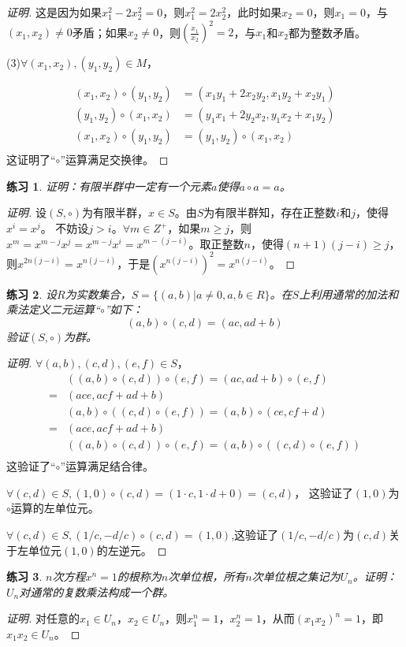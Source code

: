\documentclass{article}
\newtheorem{Exercise}{练习}
\begin{document}
\begin{CJK*}{UTF8}{gbsn}
\begin{proof}[证明]
这是因为如果$x_1^2-2x_2^2=0$，则$x_1^2=2x_2^2$，此时如果$x_2=0$，则$x_1=0$，与$(x_1,x_2)\neq 0$矛盾；如果$x_2\neq 0$，则$(\frac{x_1}{x_2})^2=2$，与$x_1$和$x_2$都为整数矛盾。

(3)$\forall (x_1,x_2), (y_1,y_2)\in M$，

\begin{align*}
  (x_1,x_2)\circ (y_1,y_2) &= (x_1y_1+2x_2y_2,x_1y_2+x_2y_1)\\
  (y_1,y_2)\circ (x_1,x_2) &= (y_1x_1+2y_2x_2,y_1x_2+x_1y_2)\\
  (x_1,x_2)\circ (y_1,y_2) &= (y_1,y_2)\circ (x_1,x_2)\\
\end{align*}
这证明了“$\circ$”运算满足交换律。
\end{proof}

\begin{Exercise}
  证明：有限半群中一定有一个元素$a$使得$a\circ a=a$。
\end{Exercise}

\begin{proof}[证明]
  设$(S,\circ)$为有限半群，$x\in S$。由$S$为有限半群知，存在正整数$i$和$j$，使得$x^i=x^j$。
  不妨设$j>i$。$\forall m\in Z^+$，如果$m\geq j$，则$x^m=x^{m-j}x^j=x^{m-j}x^i=x^{m-(j-i)}$。取正整数$n$，使得$(n+1)(j-i)\geq j$，则$x^{2n(j-i)}=x^{n(j-i)}$，于是$(x^{n(j-i)})^2=x^{n(j-i)}$。
\end{proof}
\begin{Exercise}
  设$R$为实数集合，$S=\{(a,b)|a\neq 0,a,b\in R\}$。在$S$上利用通常的加法和乘法定义二元运算“$\circ$”如下：
  \[(a,b)\circ (c,d) = (ac, ad + b)\]
  验证$(S,\circ)$为群。
\end{Exercise}
\begin{proof}[证明]
  $\forall (a,b),(c,d),(e,f)\in S$，
  \begin{align*}
    &((a,b)\circ (c,d))\circ (e,f) = (ac,ad+b)\circ (e,f)\\
    =&(ace,acf+ad+b)\\
    &(a,b)\circ ((c,d)\circ (e,f)) = (a,b)\circ (ce,cf+d)\\
    =&(ace,acf+ad+b)\\
    &((a,b)\circ (c,d))\circ (e,f) = (a,b)\circ ((c,d)\circ (e,f))\\
  \end{align*}
  这验证了“$\circ$”运算满足结合律。

  $\forall (c,d)\in S, (1,0)\circ (c,d) = (1\cdot c, 1\cdot d + 0) = (c,d)$，
这验证了$(1,0)$为$\circ$运算的左单位元。

$\forall (c,d)\in S,(1/c,-d/c)\circ (c,d) = (1,0)$,这验证了$(1/c,-d/c)$为$(c,d)$关于左单位元$(1,0)$的左逆元。
\end{proof}
\begin{Exercise}
  $n$次方程$x^n=1$的根称为$n$次单位根，所有$n$次单位根之集记为$U_n$。证明：$U_n$对通常的复数乘法构成一个群。
\end{Exercise}
\begin{proof}[证明]
  对任意的$x_1\in U_n$，$x_2\in U_n$，则$x^n_1=1$，$x_2^n=1$，从而$(x_1x_2)^n=1$，即$x_1x_2\in U_n$。


\end{proof}
\end{CJK*}
\end{document}
